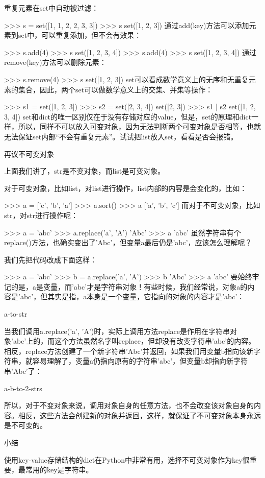重复元素在set中自动被过滤：

>>> s = set([1, 1, 2, 2, 3, 3])
>>> s
set([1, 2, 3])
通过add(key)方法可以添加元素到set中，可以重复添加，但不会有效果：

>>> s.add(4)
>>> s
set([1, 2, 3, 4])
>>> s.add(4)
>>> s
set([1, 2, 3, 4])
通过remove(key)方法可以删除元素：

>>> s.remove(4)
>>> s
set([1, 2, 3])
set可以看成数学意义上的无序和无重复元素的集合，因此，两个set可以做数学意义上的交集、并集等操作：

>>> s1 = set([1, 2, 3])
>>> s2 = set([2, 3, 4])
set([2, 3])
>>> s1 | s2
set([1, 2, 3, 4])
set和dict的唯一区别仅在于没有存储对应的value，但是，set的原理和dict一样，所以，同样不可以放入可变对象，因为无法判断两个可变对象是否相等，也就无法保证set内部“不会有重复元素”。试试把list放入set，看看是否会报错。

再议不可变对象

上面我们讲了，str是不变对象，而list是可变对象。

对于可变对象，比如list，对list进行操作，list内部的内容是会变化的，比如：

>>> a = ['c', 'b', 'a']
>>> a.sort()
>>> a
['a', 'b', 'c']
而对于不可变对象，比如str，对str进行操作呢：

>>> a = 'abc'
>>> a.replace('a', 'A')
'Abc'
>>> a
'abc'
虽然字符串有个replace()方法，也确实变出了'Abc'，但变量a最后仍是'abc'，应该怎么理解呢？

我们先把代码改成下面这样：

>>> a = 'abc'
>>> b = a.replace('a', 'A')
>>> b
'Abc'
>>> a
'abc'
要始终牢记的是，a是变量，而'abc'才是字符串对象！有些时候，我们经常说，对象a的内容是'abc'，但其实是指，a本身是一个变量，它指向的对象的内容才是'abc'：

a-to-str

当我们调用a.replace('a', 'A')时，实际上调用方法replace是作用在字符串对象'abc'上的，而这个方法虽然名字叫replace，但却没有改变字符串'abc'的内容。相反，replace方法创建了一个新字符串'Abc'并返回，如果我们用变量b指向该新字符串，就容易理解了，变量a仍指向原有的字符串'abc'，但变量b却指向新字符串'Abc'了：

a-b-to-2-strs

所以，对于不变对象来说，调用对象自身的任意方法，也不会改变该对象自身的内容。相反，这些方法会创建新的对象并返回，这样，就保证了不可变对象本身永远是不可变的。

小结

使用key-value存储结构的dict在Python中非常有用，选择不可变对象作为key很重要，最常用的key是字符串。

